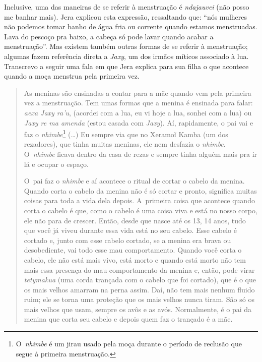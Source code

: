 Inclusive, uma das maneiras de se referir à menstruação é \emph{ndajauvei} (não
posso me banhar mais). Jera explicou esta expressão, ressaltando que:
``nós mulheres não podemos tomar banho de água fria ou corrente quando
estamos menstruadas. Lava do pescoço pra baixo, a cabeça só pode lavar
quando acabar a menstruação''. Mas existem também outras formas de se
referir à menstruação; algumas fazem referência direta a \emph{Jaxy}, um dos
irmãos míticos associado à lua. Transcrevo a seguir uma fala em que
Jera explica para sua filha o que acontece quando a moça menstrua pela
primeira vez. 

\begin{quote}
\noindent
As meninas são ensinadas a contar para a mãe quando vem pela primeira
vez a menstruação. Tem umas formas que a menina é ensinada para falar:
\emph{aexa Jaxy ra’u}, (acordei com a lua, eu vi hoje a lua, sonhei com a lua)
ou \emph{Jaxy re ma amenda} (estou casada com \emph{Jaxy}). Aí, rapidamente, o pai
vai e faz o \emph{nhimbe}\footnote[13]{O~\emph{nhimbe} é um jirau usado pela moça durante
o período de reclusão que segue à primeira menstruação.} (\ldots{}) Eu
sempre via que no Xeramoĩ Kamba (um dos rezadores), que tinha muitas
meninas, ele nem desfazia o \emph{nhimbe}. O~\emph{nhimbe} ficava dentro da casa de
rezas e sempre tinha alguém mais pra ir lá e ocupar o espaço. 

\noindent
O~pai faz o \emph{nhimbe} e aí acontece o ritual de cortar o cabelo da menina.
Quando corta o cabelo da menina não é só cortar e pronto, significa
muitas coisas para toda a vida dela depois. A~primeira coisa que
acontece quando corta o cabelo é que, como o cabelo é uma coisa viva e
está no nosso corpo, ele não para de crescer. Então, desde que nasce
até os 13, 14 anos, tudo que você já viveu durante essa vida está no
seu cabelo. Esse cabelo é cortado e, junto com esse cabelo cortado, se
a menina era brava ou desobediente, vai todo esse mau comportamento.
Quando você corta o cabelo, ele não está mais vivo, está morto e quando
está morto não tem mais essa presença do mau comportamento da menina e,
então, pode virar \emph{tetymakua} (uma corda trançada com o cabelo que foi
cortado), que é o que os mais velhos amarram na perna assim. Daí, não
tem mais nenhum fluido ruim; ele se torna uma proteção que os mais
velhos nunca tiram. São só os mais velhos que usam, sempre os avôs e as
avós. Normalmente, é o pai da menina que corta seu cabelo e depois quem
faz o trançado é a mãe. 
\end{quote}

